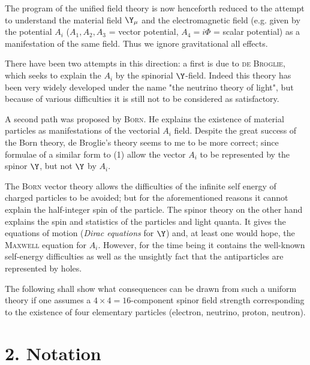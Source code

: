 \documentclass{article}
\begin{document}
The program of the unified field theory is now henceforth reduced to the attempt to understand the material field $\Y_\mu$ and the electromagnetic field (e.g. given by the potential $A_i$ ($A_1,A_2,A_3$ = vector potential, $A_4 = i\Phi$ = scalar potential) as a manifestation of the same field. Thus we ignore gravitational all effects.

There have been two attempts in this direction: a first is due to \textsc{de Broglie}\cite{5}, which seeks to explain the $A_i$ by the spinorial $\Y$-field. Indeed this theory has been very widely developed under the name "the neutrino theory of light"\cite{6}, but because of various difficulties it is still not to be considered as satisfactory.

A second path was proposed by \textsc{Born}\cite{7}. He explains the existence of material particles as manifestations of the vectorial $A_i$ field. Despite the great success of the Born theory, de Broglie's theory seems to me to be more correct; since formulae of a similar form to (1) allow the vector $A_i$ to be represented by the spinor $\Y$, but not $\Y$ by $A_i$. 

The \textsc{Born} vector theory allows the difficulties of the infinite self energy of charged particles to be avoided; but for the aforementioned reasons it cannot explain the half-integer spin of the particle. The spinor theory on the other hand explains the spin and statistics of the particles and light quanta. It gives the equations of motion (\textit{Dirac equations} for $\Y$) and, at least one would hope, the \textsc{Maxwell} equation for $A_i$. However, for the time being it contains the well-known self-energy difficulties as well as the unsightly fact that the antiparticles are represented by holes.

The following shall show what consequences can be drawn from such a uniform theory if one assumes a $4 \times 4 = 16$-component spinor field strength corresponding to the existence of four elementary particles (electron, neutrino, proton, neutron).

\section*{2. Notation}
\end{document}
